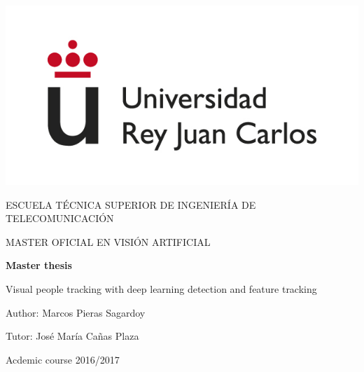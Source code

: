 \begin{titlepage}
	
	\begin{center}
		\vspace*{7.7mm}
		\begin{center}
			\includegraphics[width=0.4\linewidth]{figures/logo.jpg}
		\end{center}
		\vspace{6.5mm}
		
		\fontsize{15.5}{14}\selectfont ESCUELA TÉCNICA SUPERIOR DE INGENIERÍA DE TELECOMUNICACIÓN
		\vspace{13mm}
		
		\fontsize{14}{14}\selectfont MASTER OFICIAL EN VISIÓN ARTIFICIAL 
		
		\vspace{70pt}
		
		\fontsize{15.7}{14}\selectfont \textbf{Master thesis} 
		
		\vspace{25mm}
		\begin{huge}
			Visual people tracking with deep learning detection and feature tracking
		\end{huge}
		
		\vspace{25mm}
		
		\begin{large}
			Author: Marcos Pieras Sagardoy
			
			Tutor: José María Cañas Plaza
						
			\vspace{10mm}
		\end{large}
		\begin{normalsize}
			Acdemic course 2016/2017		
		\end{normalsize}
		\vspace{10mm}
		
	\end{center}
	
\end{titlepage}

\pagebreak
\thispagestyle{empty}
\vspace*{12cm}

